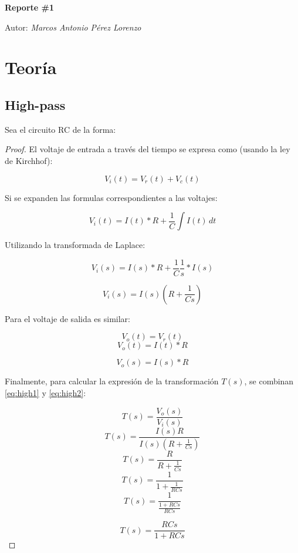 \documentclass{article}[12pt,a4paper]
\begin{document}
\begin{titlepage}

  \centering
  {\huge\bfseries Reporte \#1\par}
	{\Large Autor: \itshape Marcos Antonio Pérez Lorenzo\par}
\end{titlepage}

\pagebreak

\section{Teoría}

\subsection{High-pass}
Sea el circuito RC de la forma:

\begin{proof}

  El voltaje de entrada a través del tiempo se expresa como (usando la ley de Kirchhof):

  $$V_{i}(t)=V_{r}(t)+V_{c}(t)$$

  Si se expanden las formulas correspondientes a las voltajes:

  $$V_{i}(t)=I(t)*R+\frac{1}{C}\int I(t)\,dt$$

  Utilizando la transformada de Laplace:

  $$V_{i}(s)=I(s)*R+\frac{1}{C}\frac{1}{s}*I(s)$$

  \begin{equation}
    V_{i}(s)=I(s)\left(R+\frac{1}{Cs}\right)
    \label{eq:high1}
  \end{equation}

  Para el voltaje de salida es similar:

  $$V_{o}(t)=V_{r}(t)$$
  $$V_{o}(t)=I(t)*R$$

  \begin{equation}
    V_{o}(s)=I(s)*R
    \label{eq:high2}
  \end{equation}

  Finalmente, para calcular la expresión de la transformación \(T(s)\), se combinan \ref{eq:high1} y \ref{eq:high2}:

  $$T(s)=\frac{V_{o}(s)}{V_{i}(s)}$$
  $$T(s)=\frac{I(s)R}{I(s)\left(R+\frac{1}{Cs}\right)}$$
  $$T(s)=\frac{R}{R+\frac{1}{Cs}}$$
  $$T(s)=\frac{1}{1+\frac{1}{RCs}}$$
  $$T(s)=\frac{1}{\frac{1+RCs}{RCs}}$$

  \begin{equation}
    T(s)=\frac{RCs}{1+RCs}
    \label{eq:rhigh}
  \end{equation}
\end{proof}
\end{document}
